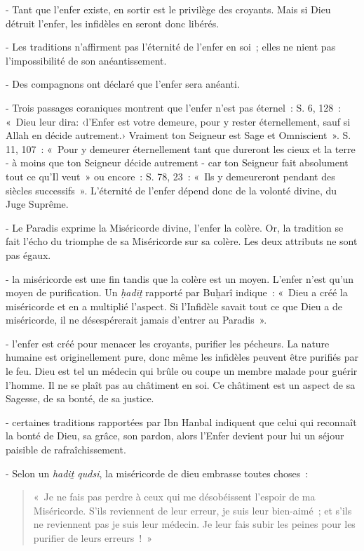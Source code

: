 - Tant que l'enfer existe, en sortir est le privilège des croyants. Mais
si Dieu détruit l'enfer, les infidèles en seront donc libérés.

- Les traditions n'affirment pas l'éternité de l'enfer en soi~; elles ne
nient pas l'impossibilité de son anéantissement.

- Des compagnons ont déclaré que l'enfer sera anéanti.

- Trois passages coraniques montrent que l'enfer n'est pas éternel~: S.
6, 128~: «~Dieu leur dira: ‹l'Enfer est votre demeure, pour y rester
éternellement, sauf si Allah en décide autrement.› Vraiment ton Seigneur
est Sage et Omniscient~». S. 11, 107~: «~Pour y demeurer éternellement
tant que dureront les cieux et la terre - à moins que ton Seigneur
décide autrement - car ton Seigneur fait absolument tout ce qu'Il veut~»
ou encore~: S. 78, 23~: «~Ils y demeureront pendant des siècles
successifs~». L'éternité de l'enfer dépend donc de la volonté divine, du
Juge Suprême.

- Le Paradis exprime la Miséricorde divine, l'enfer la colère. Or, la
tradition se fait l'écho du triomphe de sa Miséricorde sur sa colère.
Les deux attributs ne sont pas égaux.

- la miséricorde est une fin tandis que la colère est un moyen. L'enfer
n'est qu'un moyen de purification. Un \emph{ḥadīṯ} rapporté par Buḫarî
indique~: «~Dieu a créé la miséricorde et en a multiplié l'aspect. Si
l'Infidèle savait tout ce que Dieu a de miséricorde, il ne désespérerait
jamais d'entrer au Paradis~»\sn{}.

- l'enfer est créé pour menacer les croyants, purifier les pécheurs. La
nature humaine est originellement pure, donc même les infidèles peuvent
être purifiés par le feu. Dieu est tel un médecin qui brûle ou coupe un
membre malade pour guérir l'homme. Il ne se plaît pas au châtiment en
soi. Ce châtiment est un aspect de sa Sagesse, de sa bonté, de sa
justice.

- certaines traditions rapportées par Ibn Hanbal indiquent que celui qui
reconnaît la bonté de Dieu, sa grâce, son pardon, alors l'Enfer devient
pour lui un séjour paisible de rafraîchissement.

- Selon un \emph{hadiṯ qudsi}, la miséricorde de dieu embrasse toutes
choses~: 
\begin{quote}
    «~Je ne fais pas perdre à ceux qui me désobéissent l'espoir de
ma Miséricorde. S'ils reviennent de leur erreur, je suis leur
bien-aimé~; et s'ils ne reviennent pas je suis leur médecin. Je leur
fais subir les peines pour les purifier de leurs erreurs~!~»
\end{quote}


